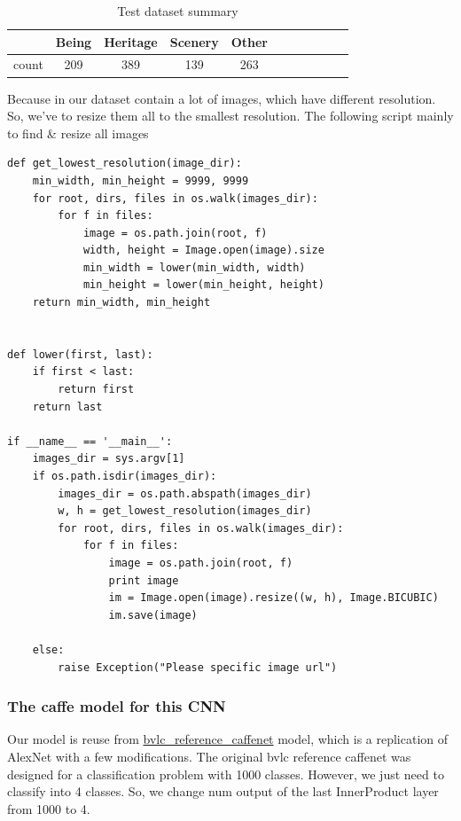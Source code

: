 \documentclass[11pt]{article}
\begin{document}
\begin{table}[H]
\begin{center}
\begin{tabular}{| c | c | c | c | c | c | c | c | c | c | c |}
\hline
 & Being & Heritage & Scenery & Other\\
\hline
count & 209 & 389 & 139 & 263\\
\hline
\end{tabular}
\caption {Test dataset summary}
\end{center}
\end{table}
Because in our dataset contain a lot of images, which have different resolution. So, we've to resize them all to the smallest resolution. The following script mainly to find \& resize all images 
\begin{lstlisting}
def get_lowest_resolution(image_dir):
    min_width, min_height = 9999, 9999
    for root, dirs, files in os.walk(images_dir):
        for f in files:
            image = os.path.join(root, f)
            width, height = Image.open(image).size
            min_width = lower(min_width, width)
            min_height = lower(min_height, height)
    return min_width, min_height


def lower(first, last):
    if first < last:
        return first
    return last

if __name__ == '__main__':
    images_dir = sys.argv[1]
    if os.path.isdir(images_dir):
        images_dir = os.path.abspath(images_dir)
        w, h = get_lowest_resolution(images_dir)
        for root, dirs, files in os.walk(images_dir):
            for f in files:
                image = os.path.join(root, f)
                print image
                im = Image.open(image).resize((w, h), Image.BICUBIC)
                im.save(image)

    else:
        raise Exception("Please specific image url")
\end{lstlisting}

\subsubsection{The caffe model for this CNN}
Our model is reuse from \href{https://github.com/BVLC/caffe/tree/master/models/bvlc\_reference\_caffenet}{bvlc\_reference\_caffenet} model, which is a replication of AlexNet with a few modifications. The original bvlc reference caffenet was designed for a classification problem with 1000 classes. However, we just need to classify into 4 classes. So, we change num output of the last
InnerProduct layer from 1000 to 4.
\end{document}
